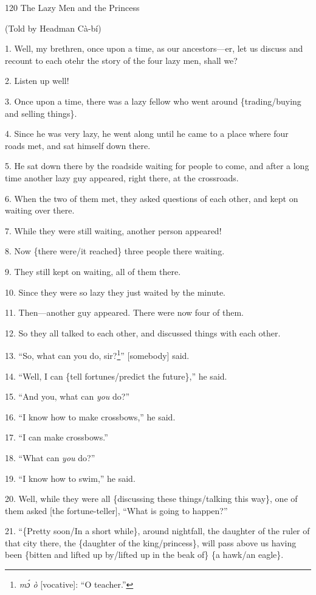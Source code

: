 
120 The Lazy Men and the Princess

(Told by Headman Cà-bí)

1. Well, my brethren, once upon a time, as our ancestors---er, let us discuss and
recount to each otehr the story of the four lazy men, shall we?

2. Listen up well!

3. Once upon a time, there was a lazy fellow who went around \{trading/buying and
selling things\}.

4. Since he was very lazy, he went along until he came to a place where four roads
met, and sat himself down there.

5. He sat down there by the roadside waiting for people to come, and after a long
time another lazy guy appeared, right there, at the crossroads.

6. When the two of them met, they asked questions of each other, and kept on waiting
over there.

7. While they were still waiting, another person appeared!

8. Now \{there were/it reached\} three people there waiting.

9. They still kept on waiting, all of them there.

10. Since they were so lazy they just waited by the minute.

11. Then---another guy appeared. There were now four of them.

12. So they all talked to each other, and discussed things with each other.

13. ``So, what can you do, sir?\footnote{\textit{mɔ́ ò }[vocative]: ``O teacher.''}'' [somebody] said.

14. ``Well, I can \{tell fortunes/predict the future\},'' he said.

15. ``And you, what can \textit{you} do?''

16. ``I know how to make crossbows,'' he said.

17. ``I can make crossbows.''

18. ``What can \textit{you} do?''

19. ``I know how to swim,'' he said.

20. Well, while they were all \{discussing these things/talking this way\}, one
of them asked [the fortune-teller], ``What is going to happen?''

21. ``\{Pretty soon/In a short while\}, around nightfall, the daughter of the ruler
of that city there, the \{daughter of the king/princess\}, will pass above us having
been \{bitten and lifted up by/lifted up in the beak of\} \{a hawk/an eagle\}.

